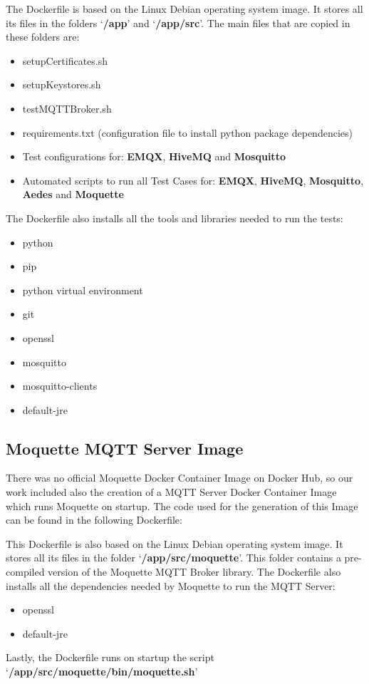 \documentclass[binding=0.6cm,noexaminfo]{sapthesis}
\begin{document}
The Dockerfile is based on the Linux Debian operating system image. It stores all its files in the folders `\textbf{/app}' and `\textbf{/app/src}'. The main files that are copied in these folders are:
\begin{itemize}
	\item setupCertificates.sh
	\item setupKeystores.sh
	\item testMQTTBroker.sh
	\item requirements.txt (configuration file to install python package dependencies)
	\item Test configurations for: \textbf{EMQX}, \textbf{HiveMQ} and \textbf{Mosquitto}
	\item Automated scripts to run all Test Cases for: \textbf{EMQX}, \textbf{HiveMQ}, \textbf{Mosquitto}, \textbf{Aedes} and \textbf{Moquette}
\end{itemize}

The Dockerfile also installs all the tools and libraries needed to run the tests:
\begin{itemize}
	\item python
	\item pip
	\item python virtual environment
	\item git
	\item openssl
	\item mosquitto
	\item mosquitto-clients
	\item default-jre
\end{itemize}
\subsection{Moquette MQTT Server Image}
There was no official Moquette Docker Container Image on Docker Hub, so our work included also the creation of a MQTT Server Docker Container Image which runs Moquette on startup.
The code used for the generation of this Image can be found in the following Dockerfile:


This Dockerfile is also based on the Linux Debian operating system image. It stores all its files in the folder `\textbf{/app/src/moquette}'. This folder contains a pre-compiled version of the Moquette MQTT Broker library.
The Dockerfile also installs all the dependencies needed by Moquette to run the MQTT Server:
\begin{itemize}
	\item openssl
	\item default-jre
\end{itemize}
Lastly, the Dockerfile runs on startup the script `\textbf{/app/src/moquette/bin/moquette.sh}'
\end{document}

